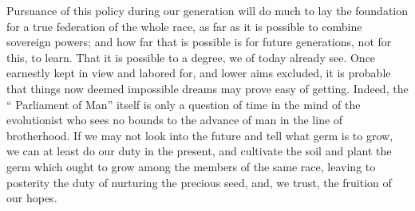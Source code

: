 \documentclass[11pt,openany]{book}
\begin{document}
Pursuance of this policy during our generation will do much to lay the foundation for a true federation of the whole race, as far as it is possible to combine sovereign powers; and how far that is possible is for future generations, not for this, to learn. That it is possible to a degree, we of today already see. Once earnestly kept in view and labored for, and lower aims excluded, it is probable that things now deemed impossible dreams may prove easy of getting. Indeed, the `` Parliament of Man'' itself is only a question of time in the mind of the evolutionist who sees no bounds to the advance of man in the line of brotherhood. If we may not look into the future and tell what germ is to grow, we can at least do our duty in the present, and cultivate the soil and plant the germ which ought to grow among the members of the same race, leaving to posterity the duty of nurturing the precious seed, and, we trust, the fruition of our hopes.
\end{document}
